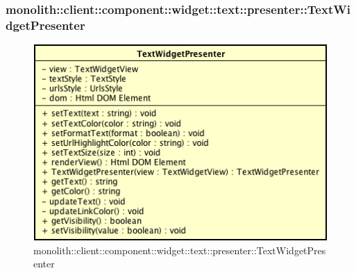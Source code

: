 \subsubsection{monolith::client::component::widget::text::presenter::TextWidgetPresenter}

\label{monolith::client::component::widget::text::presenter::TextWidgetPresenter}
\begin{figure}[H]
	\centering
	\includegraphics[scale=0.5]{Sezioni/SottosezioniST/img/TextWidgetPresenter.png}
	\caption{monolith::client::component::widget::text::presenter::TextWidgetPresenter}
\end{figure}

